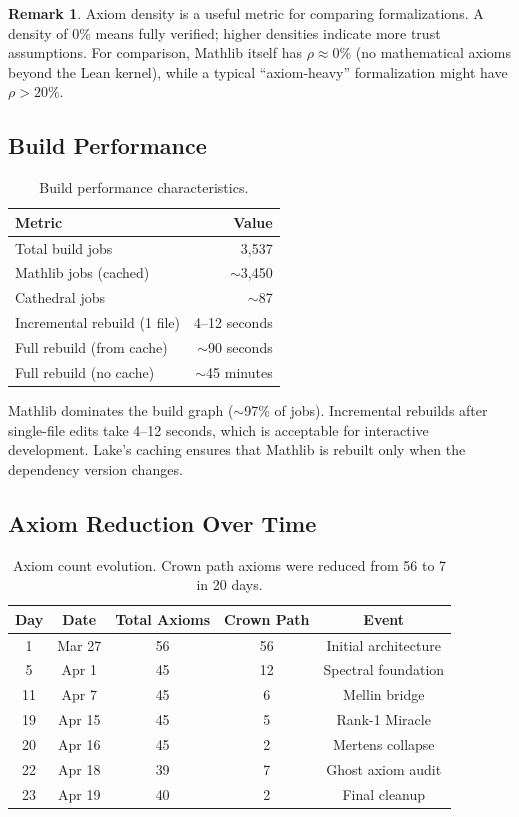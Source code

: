 \documentclass[11pt,a4paper]{article}
\theoremstyle{definition}
\newtheorem{remark}[definition]{Remark}
\begin{document}
\begin{remark}
Axiom density is a useful metric for comparing formalizations. A
density of 0\% means fully verified; higher densities indicate more
trust assumptions. For comparison, Mathlib itself has $\rho \approx 0\%$
(no mathematical axioms beyond the Lean kernel), while a typical
``axiom-heavy'' formalization might have $\rho > 20\%$.
\end{remark}

\subsection{Build Performance}

\begin{table}[h]
\centering
\begin{tabular}{@{}lr@{}}
\toprule
\textbf{Metric} & \textbf{Value} \\
\midrule
Total build jobs & 3,537 \\
Mathlib jobs (cached) & $\sim$3,450 \\
Cathedral jobs & $\sim$87 \\
Incremental rebuild (1 file) & 4--12 seconds \\
Full rebuild (from cache) & $\sim$90 seconds \\
Full rebuild (no cache) & $\sim$45 minutes \\
\bottomrule
\end{tabular}
\caption{Build performance characteristics.}
\label{tab:build}
\end{table}

Mathlib dominates the build graph ($\sim$97\% of jobs). Incremental
rebuilds after single-file edits take 4--12 seconds, which is
acceptable for interactive development. Lake's caching ensures that
Mathlib is rebuilt only when the dependency version changes.

\subsection{Axiom Reduction Over Time}

\begin{table}[h]
\centering
\begin{tabular}{@{}ccccc@{}}
\toprule
\textbf{Day} & \textbf{Date} & \textbf{Total Axioms} & \textbf{Crown Path} & \textbf{Event} \\
\midrule
1 & Mar 27 & 56 & 56 & Initial architecture \\
5 & Apr 1 & 45 & 12 & Spectral foundation \\
11 & Apr 7 & 45 & 6 & Mellin bridge \\
19 & Apr 15 & 45 & 5 & Rank-1 Miracle \\
20 & Apr 16 & 45 & 2 & Mertens collapse \\
22 & Apr 18 & 39 & 7 & Ghost axiom audit \\
23 & Apr 19 & 40 & 2 & Final cleanup \\
\bottomrule
\end{tabular}
\caption{Axiom count evolution. Crown path axioms were reduced
from 56 to 7 in 20 days.}
\label{tab:axiom-history}
\end{table}
\end{document}
